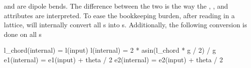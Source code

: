  and  are dipole bends. The difference between
the two is the way the , , and  attributes are interpreted.
To ease the bookkeeping burden, after reading in a lattice, \bmad will
internally convert all s into s. 
Additionally, the following conversion is done on all s
\begin{example}
  l_chord(internal) = l(input)
  l(internal) = 2 * asin(l_chord * g / 2) / g
  e1(internal) = e1(input) + theta / 2
  e2(internal) = e2(input) + theta / 2
\end{example}

\begin{figure}[tb]
  \centering
  \hspace{1cm}
  \subfigure[sbend]

\end{figure}
